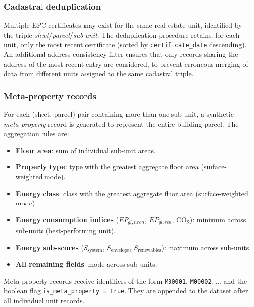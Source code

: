 \documentclass[runningheads,orivec]{llncs}
\begin{document}
\subsubsection{Cadastral deduplication}

Multiple EPC certificates may exist for the same real-estate unit,
identified by the triple
\textit{sheet}/\textit{parcel}/\textit{sub-unit}.
The deduplication procedure retains, for each unit, only the most
recent certificate (sorted by \texttt{certificate\_date} descending).
An additional address-consistency filter ensures that only records
sharing the address of the most recent entry are considered, to
prevent erroneous merging of data from different units assigned to
the same cadastral triple.

\subsubsection{Meta-property records}

For each (sheet, parcel) pair containing more than one
sub-unit, a synthetic \emph{meta-property} record is generated to
represent the entire building parcel. The aggregation rules are:

\begin{itemize}
  \item \textbf{Floor area}: sum of individual sub-unit areas.
  \item \textbf{Property type}: type with the greatest aggregate
        floor area (surface-weighted mode).
  \item \textbf{Energy class}: class with the greatest aggregate
        floor area (surface-weighted mode).
  \item \textbf{Energy consumption indices}
        ($EP_{gl,nren}$, $EP_{gl,ren}$, CO\textsubscript{2}):
        minimum across sub-units (best-performing unit).
  \item \textbf{Energy sub-scores} ($S_\text{system}$,
        $S_\text{envelope}$, $S_\text{renewables}$): maximum
        across sub-units.
  \item \textbf{All remaining fields}: mode across sub-units.
\end{itemize}

Meta-property records receive identifiers of the form
\texttt{M00001}, \texttt{M00002}, $\ldots$ and the boolean flag
\texttt{is\_meta\_property\,=\,True}. They are appended to the dataset
after all individual unit records.

\end{document}
